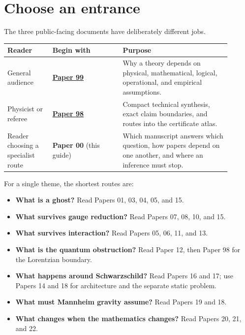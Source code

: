 \documentclass[11pt]{article}
\begin{document}
\tableofcontents

\section{Choose an entrance}

The three public-facing documents have deliberately different jobs.

\begin{center}
\small
\begin{tabular}{>{\raggedright\arraybackslash}p{0.18\linewidth}
                >{\raggedright\arraybackslash}p{0.29\linewidth}
                >{\raggedright\arraybackslash}p{0.43\linewidth}}
\toprule
Reader & Begin with & Purpose\\
\midrule
General audience
& \href{99-how-to-build-a-universe.pdf}{\textbf{Paper 99}}
& Why a theory depends on physical, mathematical, logical, operational, and
empirical assumptions.\\
Physicist or referee
& \href{98-physicist-executive-summary.pdf}{\textbf{Paper 98}}
& Compact technical synthesis, exact claim boundaries, and routes into the
certificate atlas.\\
Reader choosing a specialist route
& \textbf{Paper 00} (this guide)
& Which manuscript answers which question, how papers depend on one another,
and where an inference must stop.\\
\bottomrule
\end{tabular}
\end{center}

For a single theme, the shortest routes are:
\begin{itemize}
\item \textbf{What is a ghost?}  Read Papers 01, 03, 04, 05, and 15.
\item \textbf{What survives gauge reduction?}  Read Papers 07, 08, 10, and 15.
\item \textbf{What survives interaction?}  Read Papers 05, 06, 11, and 13.
\item \textbf{What is the quantum obstruction?}  Read Paper 12, then Paper 98
for the Lorentzian boundary.
\item \textbf{What happens around Schwarzschild?}  Read Papers 16 and 17;
use Papers 14 and 18 for architecture and the separate static problem.
\item \textbf{What must Mannheim gravity assume?}  Read Papers 19 and 18.
\item \textbf{What changes when the mathematics changes?}  Read Papers 20,
21, and 22.
\end{itemize}
\end{document}
